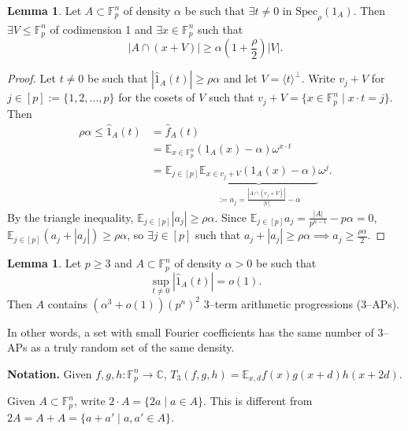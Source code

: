 \documentclass{article}
\theoremstyle{definition}
\newtheorem{lemma}[theorem]{Lemma}
\begin{document}
\begin{lemma}\label{lemma1.15}
    Let $A \subset \mathbb{F}_p^n$ of density $\alpha$ be such that $\exists t \neq 0$ in $\text{Spec}_{\rho}(1_A)$. Then $\exists V \le \mathbb{F}_p^n$ of codimension 1 and $\exists x \in \mathbb{F}_p^n$ such that \[
    |A \cap (x+V)| \ge \alpha \left(1+\frac{\rho}{2}\right)|V|.
    \]
\end{lemma}
\begin{proof}
    Let $t\neq 0$ be such that $|\hat{1}_A(t)|\ge \rho \alpha$ and let $V = \langle t \rangle^{\perp}$. Write $v_j + V$ for $j \in [p] := \{1,2,\ldots,p\}$ for the cosets of $V$ such that $v_j + V = \{x \in \mathbb{F}_p^n \mid x \cdot t = j\}$. Then 
    \begin{align*}
        \rho \alpha \le \hat{1}_A(t) &= \hat{f}_A(t) \\
        &= \mathbb{E}_{x \in \mathbb{F}_p^n}(1_A(x)-\alpha)\omega^{x \cdot t} \\
        &= \mathbb{E}_{j \in [p]}\underbrace{\mathbb{E}_{x \in v_j+V}(1_A(x)-\alpha)}_{:= a_j = \frac{|A \cap (v_j +V)|}{|V|}-\alpha}\omega^j.
    \end{align*}
    By the triangle inequality, $\mathbb{E}_{j \in [p]} |a_j|\ge \rho \alpha$. Since $\mathbb{E}_{j \in [p]}a_j = \frac{|A|}{p^{n-1}}- p \alpha = 0$, $\mathbb{E}_{j \in [p]}(a_j + |a_j|) \ge \rho \alpha$, so $\exists j \in [p]$ such that $a_j + |a_j| \ge \rho \alpha \implies a_j \ge \frac{\rho \alpha}{2}$.
\end{proof}


\begin{lemma}\label{lemma1.16}
    Let $p\ge 3$ and $A \subset \mathbb{F}_p^n$ of density $\alpha > 0$ be such that $$\sup_{t \neq 0} |\hat{1}_A(t)| = o(1).$$ Then $A$ contains $(\alpha^3+o(1))(p^n)^2$ 3--term arithmetic progressions (3--APs).
\end{lemma}
In other words, a set with small Fourier coefficients has the same number of 3--APs as a truly random set of the same density.
\vspace{1mm}
 
\textbf{Notation.} Given $f,g,h : \mathbb{F}_p^n \to \mathbb{C}$, $T_3(f,g,h) = \mathbb{E}_{x,d} f(x)g(x+d)h(x+2d)$. 

\vspace{1mm}
 
Given $A \subset \mathbb{F}_p^n$, write $2 \cdot A = \{2a \mid a \in A\}$. This is different from $2A = A + A =\{a + a' \mid a,a' \in A\}$.
\end{document}
